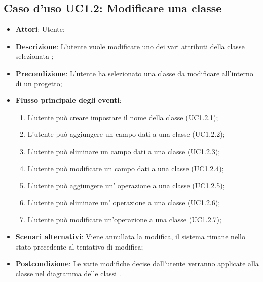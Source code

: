 \documentclass[a4paper]{report}
\begin{document}
\subsection{Caso d'uso UC1.2: Modificare una classe}
\begin{itemize}
	\item \textbf{Attori}: Utente;
	
	\item \textbf{Descrizione}: L'utente vuole modificare uno dei vari attributi della classe selezionata ;
	
	\item \textbf{Precondizione}: L'utente ha selezionato una classe da modificare all'interno di un progetto;
	
	\item \textbf{Flusso principale degli eventi}:
	\begin{enumerate}
		\item L'utente può creare impostare il nome della classe (UC1.2.1);
		\item L'utente può aggiungere un campo dati a una classe (UC1.2.2);
		\item L'utente può eliminare un campo dati a una classe (UC1.2.3);
		\item L'utente può modificare un campo dati a una classe (UC1.2.4);
		\item L'utente può aggiungere un' operazione a una classe (UC1.2.5);
		\item L'utente può eliminare un' operazione a una classe (UC1.2.6);
		\item L'utente può modificare un'operazione a una classe (UC1.2.7);
	\end{enumerate}

	\item \textbf{Scenari alternativi}: Viene annullata la modifica, il sistema 
	rimane nello stato precedente al tentativo di modifica;


	\item \textbf{Postcondizione}: Le varie modifiche decise dall'utente verranno applicate alla classe nel diagramma delle classi .
\end{itemize}
\end{document}
